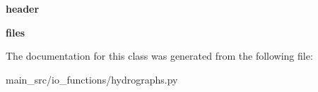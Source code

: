 \begin{DoxyCompactItemize}
\item 
\hypertarget{classmain__src_1_1io__functions_1_1hydrographs_1_1Hydrographs_a699b5f9318459b15e80bb3288920697c}{{\bfseries header}}\label{classmain__src_1_1io__functions_1_1hydrographs_1_1Hydrographs_a699b5f9318459b15e80bb3288920697c}

\item 
\hypertarget{classmain__src_1_1io__functions_1_1hydrographs_1_1Hydrographs_a65e6bddb218661ce56378b15a1bac807}{{\bfseries files}}\label{classmain__src_1_1io__functions_1_1hydrographs_1_1Hydrographs_a65e6bddb218661ce56378b15a1bac807}

\end{DoxyCompactItemize}


The documentation for this class was generated from the following file\-:\begin{DoxyCompactItemize}
\item 
main\-\_\-src/io\-\_\-functions/hydrographs.\-py\end{DoxyCompactItemize}
